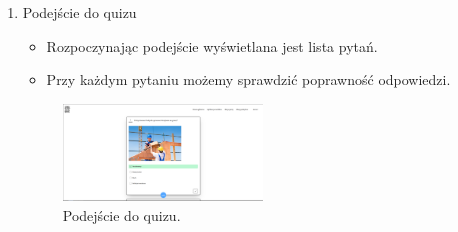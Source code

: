 \documentclass{article}
\begin{document}
\begin{enumerate}
		\item Podejście do quizu \\
        \begin{minipage}{0.4\textwidth}
          \begin{itemize}
            \item Rozpoczynając podejście wyświetlana jest lista pytań.
            \item Przy każdym pytaniu możemy sprawdzić poprawność odpowiedzi.
          \end{itemize}
        \end{minipage}
        \begin{minipage}{0.6\textwidth}
          \begin{figure}[H]
            \centering
            \includegraphics[width=0.5\textwidth]{../_assets/web/attempt.png}
            \caption{Podejście do quizu.}
            \label{fig:attempt}
          \end{figure}
        \end{minipage}


\end{enumerate}
\end{document}
